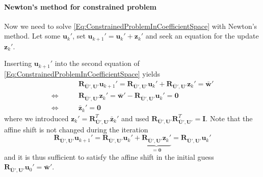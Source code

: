 \paragraph{Newton's method for constrained problem}

Now we need to solve \eqref{Eq:ConstrainedProblemInCoefficientSpace}
with Newton's method. Let some $\mathbf{u}_{k}'$, set
$\mathbf{u}_{k+1}' = \mathbf{u}_{k}' + \mathbf{z}_{k}'$ and
seek an equation for the update $\mathbf{z}_{k}'$. 

Inserting $\mathbf{u}_{k+1}'$ into the second equation of
\eqref{Eq:ConstrainedProblemInCoefficientSpace} yields
\begin{equation}\label{Eq:SideCond}
\begin{split}
& \mathbf{R}_{\bar{\mathbf{U}}',\mathbf{U}'} \mathbf{u}_{k+1}'
= \mathbf{R}_{\bar{\mathbf{U}}',\mathbf{U}'} \mathbf{u}_{k}' +
\mathbf{R}_{\bar{\mathbf{U}}',\mathbf{U}'} \mathbf{z}_{k}'
 =  \bar{\mathbf{w}}'\\ 
\Leftrightarrow\qquad &
\mathbf{R}_{\bar{\mathbf{U}}',\mathbf{U}'} \mathbf{z}_{k}' = 
\bar{\mathbf{w}}' - \mathbf{R}_{\bar{\mathbf{U}}',\mathbf{U}'}
\mathbf{u}_{k}' = \mathbf{0}\\
\Leftrightarrow\qquad &
\bar{\mathbf{z}}_{k}' = \mathbf{0}
\end{split}
\end{equation}
where we introduced $\mathbf{z}_{k}' =
\mathbf{R}^T_{\bar{\mathbf{U}}',\mathbf{U}'}
\bar{\mathbf{z}}_{k}'$ and used $\mathbf{R}_{\bar{\mathbf{U}}',\mathbf{U}'}
\mathbf{R}^T_{\bar{\mathbf{U}}',\mathbf{U}'}=\mathbf{I}$. 
Note that the affine shift is not changed during the iteration
\begin{equation}
\mathbf{R}_{\bar{\mathbf{U}}',\mathbf{U}'}\mathbf{u}_{k+1}' =
\mathbf{R}_{\bar{\mathbf{U}}',\mathbf{U}'} \mathbf{u}_{k}' +
\underbrace{\mathbf{R}_{\bar{\mathbf{U}}',\mathbf{U}'}
  \mathbf{z}_{k}'}_{= \mathbf{0}} =
\mathbf{R}_{\bar{\mathbf{U}}',\mathbf{U}'} \mathbf{u}_{k}'
\end{equation}
and it is thus sufficient to satisfy the affine shift in the initial
guess $\mathbf{R}_{\bar{\mathbf{U}}',\mathbf{U}'} \mathbf{u}_{0}' =
\bar{\mathbf{w}}'$.

